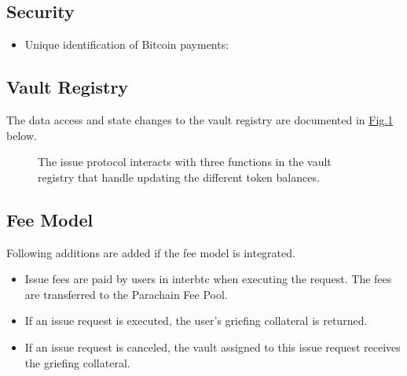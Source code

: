 \documentclass[a4paper,10pt,english]{sphinxmanual}
\begin{document}
\subsection{Security}
\label{\detokenize{spec/issue:security}}\begin{itemize}
\item {} 
Unique identification of Bitcoin payments: {\hyperref[\detokenize{security_performance/security-analysis:okd}]{}}

\end{itemize}


\subsection{Vault Registry}
\label{\detokenize{spec/issue:vault-registry}}
The data access and state changes to the vault registry are documented in \hyperref[\detokenize{spec/issue:fig-vault-registry-issue}]{Fig.\@ \ref{\detokenize{spec/issue:fig-vault-registry-issue}}} below.

\begin{figure}[htbp]
\centering
\capstart

\noindent{}
\caption{The issue protocol interacts with three functions in the vault registry that handle updating the different token balances.}\label{\detokenize{spec/issue:id15}}\label{\detokenize{spec/issue:fig-vault-registry-issue}}\end{figure}


\subsection{Fee Model}
\label{\detokenize{spec/issue:fee-model}}
Following additions are added if the fee model is integrated.
\begin{itemize}
\item {} 
Issue fees are paid by users in interbtc when executing the request. The fees are transferred to the Parachain Fee Pool.

\item {} 
If an issue request is executed, the user’s griefing collateral is returned.

\item {} 
If an issue request is canceled, the vault assigned to this issue request receives the griefing collateral.

\end{itemize}
\end{document}
